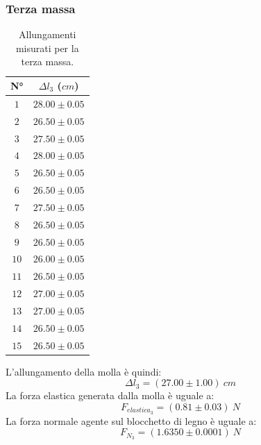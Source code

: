 \documentclass[11pt]{article}
\begin{document}
\subsubsection{Terza massa}
\begin{table}[H]
\centering
\begin{tabular}{|c|c|}
\hline
\textbf{N°} & \textbf{$\Delta l_3$ ($cm$)}\\
\hline
$1$ & $28.00\pm 0.05$ \\
\hline
$2$ & $26.50\pm 0.05$ \\
\hline
$3$ & $27.50\pm 0.05$ \\
\hline
$4$ & $28.00\pm 0.05$ \\
\hline
$5$ & $26.50\pm 0.05$ \\
\hline
$6$ & $26.50\pm 0.05$ \\
\hline
$7$ & $27.50\pm 0.05$ \\
\hline
$8$ & $26.50\pm 0.05$ \\
\hline
$9$ & $26.50\pm 0.05$ \\
\hline
$10$ & $26.00\pm 0.05$ \\
\hline
$11$ & $26.50\pm 0.05$ \\
\hline
$12$ & $27.00\pm 0.05$ \\
\hline
$13$ & $27.00\pm 0.05$ \\
\hline
$14$ & $26.50\pm 0.05$ \\
\hline
$15$ & $26.50\pm 0.05$ \\
\hline
\end{tabular}
\caption{Allungamenti misurati per la terza massa.}
\label{tab:}
\end{table}
L'allungamento della molla è quindi:
\begin{equation}
    \Delta l_3=(27.00\pm 1.00)\ cm
\end{equation}
La forza elastica generata dalla molla è uguale a:
\begin{equation}
    F_{elastica_3} = (0.81\pm 0.03)\ N
\end{equation}
La forza normale agente sul blocchetto di legno è uguale a:
\begin{equation}
    F_{N_3} = (1.6350\pm 0.0001)\ N
\end{equation}
\end{document}
